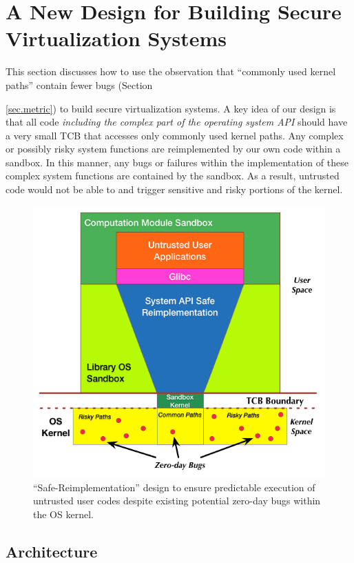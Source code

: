 \section{A New Design for Building Secure Virtualization Systems}
\label{sec.design}

This section discusses how to use the observation
 that ``commonly used kernel paths'' contain fewer bugs
(Section {\ref{sec.metric}) to build secure virtualization systems.
A key idea of our design is that all code \emph{including the complex part
of the operating system API} should have a very small TCB that accesses only
commonly used kernel paths.
Any complex or possibly risky system functions
are reimplemented by our own code within a sandbox. In this manner, any bugs
or failures within the implementation of these complex system functions
are contained by the sandbox. As a result, untrusted code would not be able to
and trigger sensitive and risky portions of the kernel.


\begin{figure}%
\centering
\includegraphics[width=1.0\columnwidth]{diagram/lind_secure_design_new.png}
\caption{``Safe-Reimplementation'' design to ensure predictable execution of untrusted user codes 
despite existing potential zero-day bugs within the OS kernel.}
\label{fig:design}
\end{figure}

\subsection{Architecture}

}
